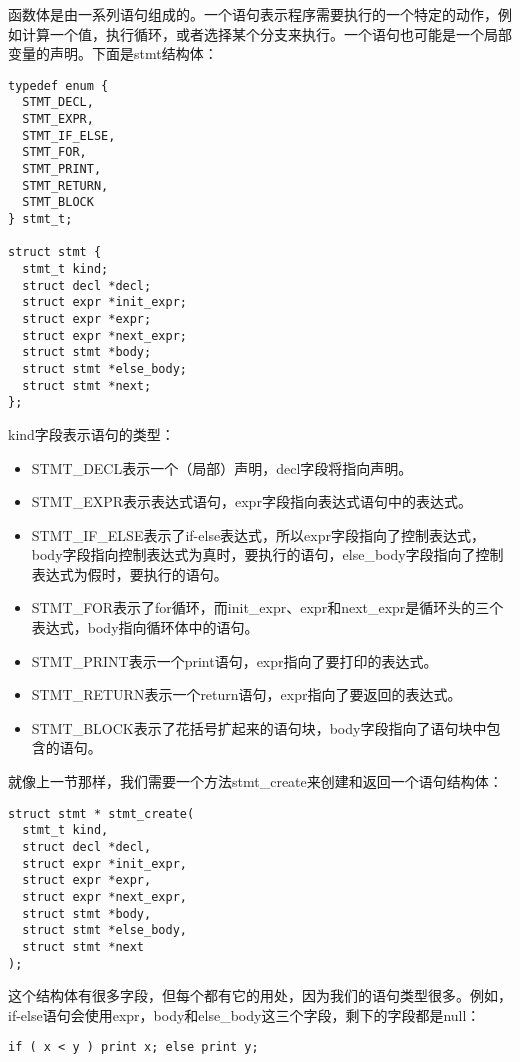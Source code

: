 \documentclass[cn,11pt,chinese]{elegantbook}
\begin{document}
函数体是由一系列语句组成的。一个语句表示程序需要执行的一个特定的动作，例如计算一个值，执行循环，或者选择某个分支来执行。一个语句也可能是一个局部变量的声明。下面是stmt结构体：

\begin{verbatim}
typedef enum {
  STMT_DECL,
  STMT_EXPR,
  STMT_IF_ELSE,
  STMT_FOR,
  STMT_PRINT,
  STMT_RETURN,
  STMT_BLOCK
} stmt_t;

struct stmt {
  stmt_t kind;
  struct decl *decl;
  struct expr *init_expr;
  struct expr *expr;
  struct expr *next_expr;
  struct stmt *body;
  struct stmt *else_body;
  struct stmt *next;
};
\end{verbatim}

kind字段表示语句的类型：

\begin{itemize}
  \item STMT\_DECL表示一个（局部）声明，decl字段将指向声明。
  \item STMT\_EXPR表示表达式语句，expr字段指向表达式语句中的表达式。
  \item STMT\_IF\_ELSE表示了if-else表达式，所以expr字段指向了控制表达式，body字段指向控制表达式为真时，要执行的语句，else\_body字段指向了控制表达式为假时，要执行的语句。
  \item STMT\_FOR表示了for循环，而init\_expr、expr和next\_expr是循环头的三个表达式，body指向循环体中的语句。
  \item STMT\_PRINT表示一个print语句，expr指向了要打印的表达式。
  \item STMT\_RETURN表示一个return语句，expr指向了要返回的表达式。
  \item STMT\_BLOCK表示了花括号扩起来的语句块，body字段指向了语句块中包含的语句。
\end{itemize}

就像上一节那样，我们需要一个方法stmt\_create来创建和返回一个语句结构体：

\begin{verbatim}
struct stmt * stmt_create(
  stmt_t kind,
  struct decl *decl,
  struct expr *init_expr,
  struct expr *expr,
  struct expr *next_expr,
  struct stmt *body,
  struct stmt *else_body,
  struct stmt *next
);
\end{verbatim}

这个结构体有很多字段，但每个都有它的用处，因为我们的语句类型很多。例如，if-else语句会使用expr，body和else\_body这三个字段，剩下的字段都是null：

\begin{verbatim}
if ( x < y ) print x; else print y;
\end{verbatim}
\end{document}
